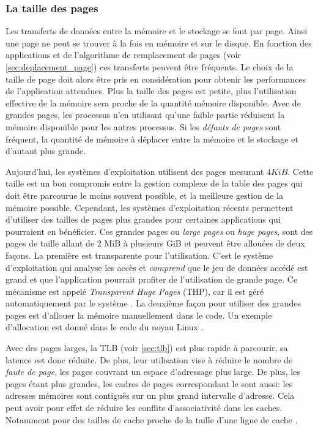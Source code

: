 \subsubsection{La taille des pages}
Les transferts de données entre la mémoire et le stockage se font par page. Ainsi une page ne peut se trouver à la fois en mémoire et sur le disque. En fonction des applications et de l'algorithme de remplacement de pages (voir \autoref{sec:deplacement_page}) ces transferts peuvent être fréquents. Le choix de la taille de page doit alors être pris en considération pour obtenir les performances de l'application attendues.
Plus la taille des pages est petite, plus l'utilisation effective de la mémoire sera proche de la quantité mémoire disponible. Avec de grandes pages, les processus n'en utilisant qu'une faible partie réduisent la mémoire disponible pour les autres processus. Si les \textit{défauts de pages} sont fréquent, la quantité de mémoire à déplacer entre la mémoire et le stockage et d'autant plus grande.

Aujourd'hui, les systèmes d'exploitation utilisent des pages mesurant $4 KiB$. Cette taille est un bon compromis entre la gestion complexe de la table des pages qui doit être parcourue le moins souvent possible, et la meilleure gestion de la mémoire possible. 
Cependant, les systèmes d'exploitation récents permettent d'utiliser des tailles de pages plus grandes pour certaines applications qui pourraient en bénéficier. Ces grandes pages ou \textit{large pages} ou \textit{huge pages}, sont des pages de taille allant de 2 MiB à plusieurs GiB et peuvent être allouées de deux façons. La première est transparente pour l'utilisation. C'est le système d'exploitation qui analyse les accès et \textit{comprend} que le jeu de données accédé est grand et que l'application pourrait profiter de l'utilisation de grande page. Ce mécanisme est appelé \textit{Transparent Huge Pages} (THP), car il est géré automatiquement par le système \cite{LinuxTHP2019}. La deuxième façon pour utiliser des grandes pages est d'allouer la mémoire manuellement dans le code. Un exemple d'allocation est donné dans le code du noyau Linux \cite{LinuxHUGE2019}.

Avec des pages larges, la TLB (voir \autoref{sec:tlb}) est plus rapide à parcourir, sa latence est donc réduite. De plus, leur utilisation vise à réduire le nombre de \textit{faute de page}, les pages couvrant un espace d'adressage plus large. De plus, les pages étant plus grandes, les cadres de pages correspondant le sont aussi: les adresses mémoires sont contiguës sur un plus grand intervalle d'adresse. Cela peut avoir pour effet de réduire les conflits d'associativité dans les caches. Notamment pour des tailles de cache proche de la taille d'une ligne de cache \cite{LinuxHUGETEST2019}.







